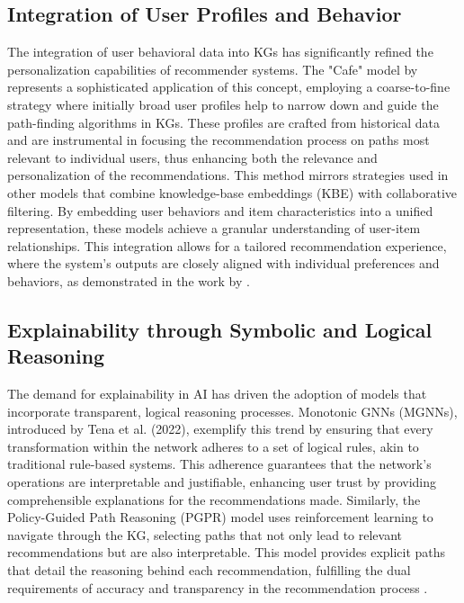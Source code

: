 \subsection{Integration of User Profiles and Behavior}

The integration of user behavioral data into KGs has significantly refined the personalization
capabilities of recommender systems. The "Cafe" model by \textcite{xian_cafe_2020} represents
a sophisticated application of this concept, employing a coarse-to-fine strategy
where initially broad user profiles help to narrow down and guide the path-finding
algorithms in KGs. These profiles are crafted from historical data and are instrumental
in focusing the recommendation process on paths most relevant to individual users,
thus enhancing both the relevance and personalization of the recommendations. This
method mirrors strategies used in other models that combine knowledge-base embeddings
(KBE) with collaborative filtering. By embedding user behaviors and item
characteristics into a unified representation, these models achieve a granular understanding
of user-item relationships. This integration allows for a tailored
recommendation experience, where the system's outputs are closely aligned with individual
preferences and behaviors, as demonstrated in the work by \textcite{ai_learning_2018}.

\subsection{Explainability through Symbolic and Logical Reasoning}

The demand for explainability in AI has driven the adoption of models that
incorporate transparent, logical reasoning processes. Monotonic GNNs (MGNNs), introduced
by Tena et al. (2022), exemplify this trend by ensuring that every transformation
within the network adheres to a set of logical rules, akin to traditional rule-based
systems. This adherence guarantees that the network's operations are interpretable
and justifiable, enhancing user trust by providing comprehensible explanations
for the recommendations made. Similarly, the Policy-Guided Path Reasoning (PGPR)
model uses reinforcement learning to navigate through the KG, selecting paths that
not only lead to relevant recommendations but are also interpretable. This model
provides explicit paths that detail the reasoning behind each recommendation, fulfilling
the dual requirements of accuracy and transparency in the recommendation process
\parencite{xian_reinforcement_2019}.

